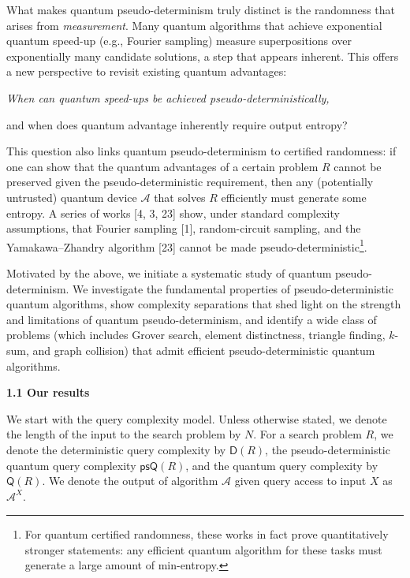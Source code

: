 \documentclass[10pt,a4paper]{article}
\begin{document}
What makes quantum pseudo-determinism truly distinct is the randomness that arises from \emph{measurement}.
Many quantum algorithms that achieve exponential quantum speed-up (e.g., Fourier sampling) measure superpositions over exponentially many candidate solutions, a step that appears inherent. This offers a new perspective to revisit existing quantum advantages:\par





{\itshape When can quantum speed-ups be achieved pseudo-deterministically,

and when does quantum advantage inherently require output entropy?}\par





This question also links quantum pseudo-determinism to certified randomness: if one can show that the quantum advantages of a certain problem ${R}$ cannot be preserved given the pseudo-deterministic requirement, then any (potentially untrusted) quantum device $\mathcal{A}$ that solves ${R}$ efficiently must generate some entropy.
A series of works [4, 3, 23] show, under standard complexity assumptions, that Fourier sampling [1], random-circuit sampling, and the Yamakawa–Zhandry algorithm [23] cannot be made pseudo-deterministic\footnote{For quantum certified randomness, these works in fact prove quantitatively stronger statements: any efficient quantum algorithm for these tasks must generate a large amount of min-entropy.}.\par




Motivated by the above, we initiate a systematic study of quantum pseudo-determinism. We investigate the fundamental properties of pseudo-deterministic quantum algorithms, show complexity separations that shed light on the strength and limitations of quantum pseudo-determinism, and identify a wide class of problems (which includes Grover search, element distinctness, triangle finding, $k$-sum, and graph collision) that admit efficient pseudo-deterministic quantum algorithms.\par




\par\medskip\noindent\textbf{
1.1 Our results}\par




We start with the query complexity model. Unless otherwise stated, we denote the length of the input to the search problem by $N$. For a search problem ${R}$, we denote the deterministic query complexity by $\mathsf{D}({R})$, the pseudo-deterministic quantum query complexity $\mathsf{psQ}({R})$, and the quantum query complexity by $\mathsf{Q}({R})$. We denote the output of algorithm $\mathcal{A}$ given query access to input $X$ as $\mathcal{A}^{X}$.\par
\end{document}
